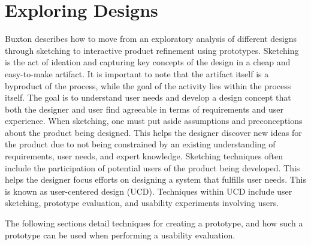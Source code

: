 \section{Exploring Designs} %
Buxton\cite{BUXTON2007135_skething,BUXTON2007139_prototyping} describes how to move from an exploratory analysis of different designs through sketching to interactive product refinement using prototypes. 
Sketching is the act of ideation and capturing key concepts of the design in a cheap and easy-to-make artifact. 
It is important to note that the artifact itself is a byproduct of the process, while the goal of the activity lies within the process itself.\cite{BUXTON2007135_skething}
The goal is to understand user needs and develop a design concept that both the designer and user find agreeable in terms of requirements and user experience. 
When sketching, one must put aside assumptions and preconceptions about the product being designed.
This helps the designer discover new ideas for the product due to not being constrained by an existing understanding of requirements, user needs, and expert knowledge.
Sketching techniques often include the participation of potential users of the product being developed.
This helps the designer focus efforts on designing a system that fulfills user needs.
This is known as user-centered design (UCD). \cite{user-centred-design}
Techniques within UCD include user sketching, prototype evaluation, and usability experiments involving users.

The following sections detail techniques for creating a prototype, and how such a prototype can be used when performing a usability evaluation.